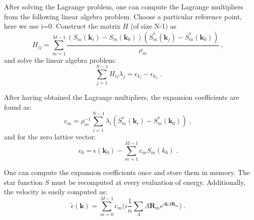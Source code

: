 \documentclass[singlecolumn,english,aps,prl,showpacs,floatfix,superscriptaddress,notitlepage]{revtex4-1}
\begin{document}
After solving the Lagrange problem, one can compute the Lagrange multipliers from the following linear algebra problem.
Choose a particular reference point, here we use i=0.
Construct the matrix $H$ (of size N-1) as
\begin{equation}
H_{ij} = \sum_{m=1}^{M-1} \frac{ (S_m(\boldsymbol{k}_i)-S_m(\boldsymbol{k}_0)) (S^*_m(\boldsymbol{k}_j) - S^*_m(\boldsymbol{k}_0)) }{\rho_m} \;,
\end{equation}
and solve the linear algebra problem:
\begin{equation}
\sum_{j=1}^{N-1} H_{ij} \lambda_j = \epsilon_{k_i} - \epsilon_{k_0} \;.
\end{equation}

After having obtained the Lagrange multipliers, the expansion coefficients are found as:
\begin{equation}
c_m = \rho_m^{-1} \sum_{i=1}^{N-1} \lambda_i ( S^*_m(\boldsymbol{k}_i) - S^*_m(\boldsymbol{k}_0) ) \;,
\end{equation}
and for the zero lattice vector:
\begin{equation}
c_0 = \epsilon(\boldsymbol{k}_0) - \sum_{m=1}^{M-1} c_m S_m(k_0) \;.
\end{equation}

One can compute the expansion coefficients once and store them in memory.
The star function $S$ must be recomputed at every evaluation of energy.
Additionally, the velocity is easily computed as:
\begin{equation}
\tilde{\epsilon}(\boldsymbol{k}) = \sum_{m=0}^{M-1} c_m \bigg( i \frac{1}{n} \sum_{\Lambda}  \Lambda \boldsymbol{R}_m e^{i\boldsymbol{k} \Lambda \boldsymbol{R}_m} \bigg) \;.
\end{equation}
\end{document}
